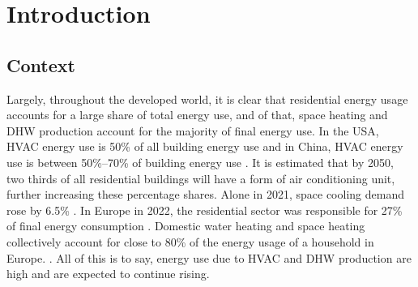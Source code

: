 \chapter{Introduction}\label{ch:intro}



\section{Context}\label{sec:context}

Largely, throughout the developed world, it is clear that residential energy usage accounts for a large share of total energy use, and of that, space heating and \ac{DHW} production account for the majority of final energy use. In the USA, \ac{HVAC} energy use is 50\% of all building energy use and in China, \ac{HVAC} energy use is between 50\%--70\% of building energy use \cite{ieaorg_2018}. It is estimated that by 2050, two thirds of all residential buildings will have a form of air conditioning unit, further increasing these percentage shares. Alone in 2021, space cooling demand rose by 6.5\% \cite{ieaorg_2022}. 
In Europe in 2022, the  residential sector was responsible for 27\% of final energy consumption \cite{eurostat_final_2018}. Domestic water heating and space heating collectively account for close to 80\% of the energy usage of a household in Europe. \cite{eurostat_energy_2020}.
All of this is to say, energy use due to \ac{HVAC} and \ac{DHW} production are high and are expected to continue rising. 

